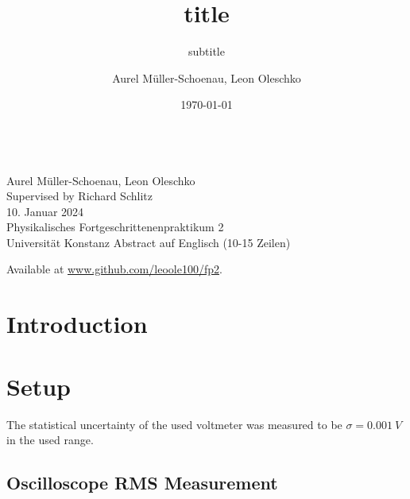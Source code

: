 \documentclass[
    parskip=half, 
    twoside=false,
    twocolumn=true,
    fontsize=11pt,
]{scrarticle}
\begin{document}
\title{title}
\subtitle{subtitle}
\author{Aurel Müller-Schoenau, Leon Oleschko}
\date{\dotdate\today}


\begin{titlepage}
    \sffamily
    \vspace*{3cm}
    {
        \fontsize{32}{32}
    }
    \vspace{.25cm}\\
    {
        \Large
        Aurel Müller-Schoenau, Leon Oleschko\\
        Supervised by Richard Schlitz
        \vspace{.05cm}\\
        10. Januar 2024
        \vspace{.25cm}\\
        \normalsize
        Physikalisches Fortgeschrittenenpraktikum 2\\
        Universität Konstanz
    }
    \vfill
    {
        \normalfont\normalsize
        Abstract auf Englisch (10-15 Zeilen)
        \blindtext[2]
    }
    \vfill
    \begin{flushright}
        Available at \url{www.github.com/leoole100/fp2}.
    \end{flushright}
\end{titlepage}

\section{Introduction}

\section{Setup}
The statistical uncertainty of the used voltmeter was measured to be $\sigma = \SI{0.001}{V}$ in the used range.

\subsection*{Oscilloscope RMS Measurement}
\end{document}
